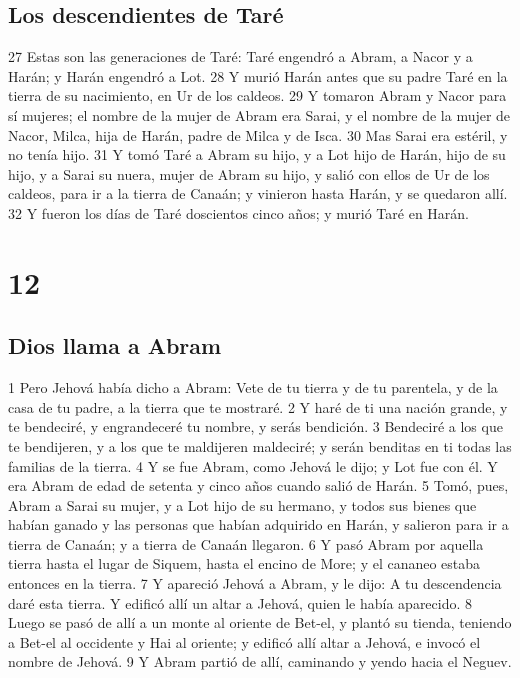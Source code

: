 \section*{Los descendientes de Taré}

27 Estas son las generaciones de Taré: Taré engendró a Abram, a Nacor y a Harán; y Harán engendró a Lot.
28 Y murió Harán antes que su padre Taré en la tierra de su nacimiento, en Ur de los caldeos.
29 Y tomaron Abram y Nacor para sí mujeres; el nombre de la mujer de Abram era Sarai, y el nombre de la mujer de Nacor, Milca, hija de Harán, padre de Milca y de Isca.
30 Mas Sarai era estéril, y no tenía hijo.
31 Y tomó Taré a Abram su hijo, y a Lot hijo de Harán, hijo de su hijo, y a Sarai su nuera, mujer de Abram su hijo, y salió con ellos de Ur de los caldeos, para ir a la tierra de Canaán; y vinieron hasta Harán, y se quedaron allí.
32 Y fueron los días de Taré doscientos cinco años; y murió Taré en Harán.

\chapter{12}

\section*{Dios llama a Abram}

1 Pero Jehová había dicho a Abram: Vete de tu tierra y de tu parentela, y de la casa de tu padre, a la tierra que te mostraré.
2 Y haré de ti una nación grande, y te bendeciré, y engrandeceré tu nombre, y serás bendición.
3 Bendeciré a los que te bendijeren, y a los que te maldijeren maldeciré; y serán benditas en ti todas las familias de la tierra.
4 Y se fue Abram, como Jehová le dijo; y Lot fue con él. Y era Abram de edad de setenta y cinco años cuando salió de Harán.
5 Tomó, pues, Abram a Sarai su mujer, y a Lot hijo de su hermano, y todos sus bienes que habían ganado y las personas que habían adquirido en Harán, y salieron para ir a tierra de Canaán; y a tierra de Canaán llegaron.
6 Y pasó Abram por aquella tierra hasta el lugar de Siquem, hasta el encino de More; y el cananeo estaba entonces en la tierra.
7 Y apareció Jehová a Abram, y le dijo: A tu descendencia daré esta tierra. Y edificó allí un altar a Jehová, quien le había aparecido.
8 Luego se pasó de allí a un monte al oriente de Bet-el, y plantó su tienda, teniendo a Bet-el al occidente y Hai al oriente; y edificó allí altar a Jehová, e invocó el nombre de Jehová.
9 Y Abram partió de allí, caminando y yendo hacia el Neguev.

